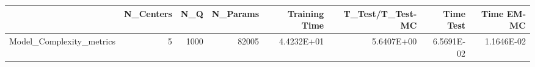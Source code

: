 \begin{tabular}{lrrrrrrr}
\toprule
{} &  N\_Centers &   N\_Q &  N\_Params &  Training Time &  T\_Test/T\_Test-MC &  Time Test &  Time EM-MC \\
\midrule
Model\_Complexity\_metrics &          5 &  1000 &     82005 &     4.4232E+01 &        5.6407E+00 & 6.5691E-02 &  1.1646E-02 \\
\bottomrule
\end{tabular}
